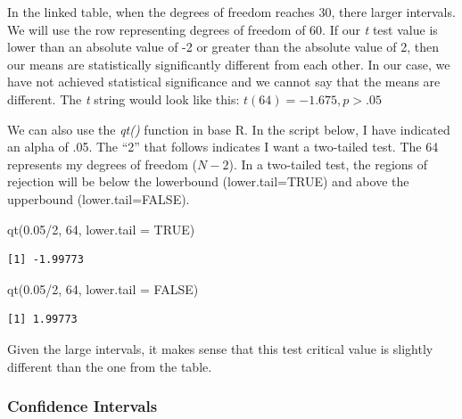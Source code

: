 \documentclass[
  11pt,
]{book}
\newenvironment{Shaded}{\begin{snugshade}}{\end{snugshade}}
\newcommand{\AttributeTok}[1]{\textcolor[rgb]{0.77,0.63,0.00}{#1}}
\newcommand{\ConstantTok}[1]{\textcolor[rgb]{0.00,0.00,0.00}{#1}}
\newcommand{\DecValTok}[1]{\textcolor[rgb]{0.00,0.00,0.81}{#1}}
\newcommand{\FloatTok}[1]{\textcolor[rgb]{0.00,0.00,0.81}{#1}}
\newcommand{\FunctionTok}[1]{\textcolor[rgb]{0.00,0.00,0.00}{#1}}
\newcommand{\NormalTok}[1]{#1}
\newcommand{\SpecialCharTok}[1]{\textcolor[rgb]{0.00,0.00,0.00}{#1}}
\begin{document}
In the linked table, when the degrees of freedom reaches 30, there larger intervals. We will use the row representing degrees of freedom of 60. If our \emph{t} test value is lower than an absolute value of -2 or greater than the absolute value of 2, then our means are statistically significantly different from each other. In our case, we have not achieved statistical significance and we cannot say that the means are different. The \emph{t} string would look like this: \(t(64) = -1.675, p > .05\)

We can also use the \emph{qt()} function in base R. In the script below, I have indicated an alpha of .05. The ``2'' that follows indicates I want a two-tailed test. The 64 represents my degrees of freedom (\(N-2\)). In a two-tailed test, the regions of rejection will be below the lowerbound (lower.tail=TRUE) and above the upperbound (lower.tail=FALSE).

\begin{Shaded}
\begin{Highlighting}[]
\FunctionTok{qt}\NormalTok{(}\FloatTok{0.05}\SpecialCharTok{/}\DecValTok{2}\NormalTok{, }\DecValTok{64}\NormalTok{, }\AttributeTok{lower.tail =} \ConstantTok{TRUE}\NormalTok{)}
\end{Highlighting}
\end{Shaded}

\begin{verbatim}
[1] -1.99773
\end{verbatim}

\begin{Shaded}
\begin{Highlighting}[]
\FunctionTok{qt}\NormalTok{(}\FloatTok{0.05}\SpecialCharTok{/}\DecValTok{2}\NormalTok{, }\DecValTok{64}\NormalTok{, }\AttributeTok{lower.tail =} \ConstantTok{FALSE}\NormalTok{)}
\end{Highlighting}
\end{Shaded}

\begin{verbatim}
[1] 1.99773
\end{verbatim}

Given the large intervals, it makes sense that this test critical value is slightly different than the one from the table.

\hypertarget{confidence-intervals-1}{%
\subsubsection{Confidence Intervals}\label{confidence-intervals-1}}
\end{document}
